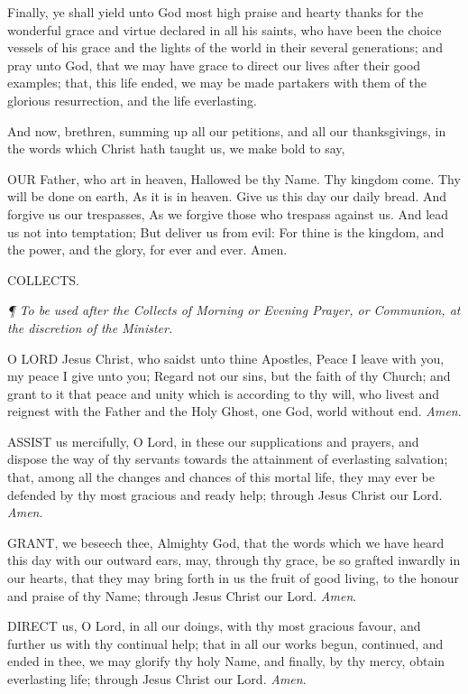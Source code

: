 Finally, ye shall yield unto God most high praise and
hearty thanks for the wonderful grace and virtue declared in all his saints,
who have been the choice vessels of his grace and the lights of the world
in their several generations; and pray unto God, that we may have grace
to direct our lives after their good examples; that, this life ended,
we may be made partakers with them of the glorious resurrection, and the
life everlasting.

And now, brethren, summing up all our petitions, and
all our thanksgivings, in the words which Christ hath taught us, we make
bold to say,

OUR
Father, who art in heaven, Hallowed be thy Name. Thy kingdom come. Thy
will be done on earth, As it is in heaven. Give us this day our daily
bread. And forgive us our trespasses, As we forgive those who trespass
against us. And lead us not into temptation; But deliver us from evil:
For thine is the kingdom, and the power, and the glory, for ever and ever.
Amen.

COLLECTS.
\emph{}

\emph{¶
To be used after the Collects of Morning or Evening Prayer, or Communion,
at the discretion of the Minister.}

O
LORD Jesus Christ, who saidst unto thine Apostles, Peace I leave with
you, my peace I give unto you; Regard not our sins, but the faith of thy
Church; and grant to it that peace and unity which is according to thy
will, who livest and reignest with the Father and the Holy Ghost, one
God, world without end. \emph{Amen}.

ASSIST
us mercifully, O Lord, in these our supplications and prayers, and dispose
the way of thy servants towards the attainment of everlasting salvation;
that, among all the changes and chances of this mortal life, they may
ever be defended by thy most gracious and ready help; through Jesus Christ
our Lord. \emph{Amen}.

GRANT,
we beseech thee, Almighty God, that the words which we have heard this
day with our outward ears, may, through thy grace, be so grafted inwardly
in our hearts, that they may bring forth in us the fruit of good living,
to the honour and praise of thy Name; through Jesus Christ our Lord. \emph{Amen}.

DIRECT
us, O Lord, in all our doings, with thy most gracious favour, and further
us with thy continual help; that in all our works begun, continued, and
ended in thee, we may glorify thy holy Name, and finally, by thy mercy,
obtain everlasting life; through Jesus Christ our Lord. \emph{Amen}.

